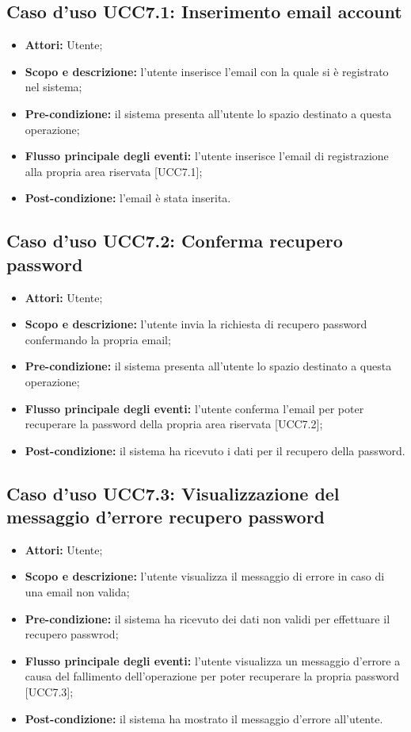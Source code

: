 \subsection{Caso d'uso UCC7.1: Inserimento email account}

\begin{itemize}
\item \textbf{Attori:} Utente;
\item \textbf{Scopo e descrizione:} l'utente inserisce l'email con la quale si è registrato nel sistema;
\item \textbf{Pre-condizione:} il sistema presenta all'utente lo spazio destinato a questa operazione;
\item \textbf{Flusso principale degli eventi:} l'utente inserisce l'email di registrazione alla propria area riservata [UCC7.1];
\item \textbf{Post-condizione:} l'email è stata inserita.
\end{itemize}

\subsection{Caso d'uso UCC7.2: Conferma recupero password}

\begin{itemize}
\item \textbf{Attori:} Utente;
\item \textbf{Scopo e descrizione:} l'utente invia la richiesta di recupero password confermando la propria email;
\item \textbf{Pre-condizione:} il sistema presenta all'utente lo spazio destinato a questa operazione;
\item \textbf{Flusso principale degli eventi:} l'utente conferma l'email per poter recuperare la password della propria area riservata [UCC7.2];
\item \textbf{Post-condizione:} il sistema ha ricevuto i dati per il recupero della password.
\end{itemize}

\subsection{Caso d'uso UCC7.3: Visualizzazione del messaggio d'errore recupero password}

\begin{itemize}
\item \textbf{Attori:} Utente;
\item \textbf{Scopo e descrizione:} l'utente visualizza il messaggio di errore in caso di una email non valida;
\item \textbf{Pre-condizione:} il sistema ha ricevuto dei dati non validi per effettuare il recupero passwrod;
\item \textbf{Flusso principale degli eventi:} l'utente visualizza un messaggio d'errore a causa del fallimento dell'operazione per poter recuperare la propria password [UCC7.3];
\item \textbf{Post-condizione:} il sistema ha mostrato il messaggio d'errore all'utente.
\end{itemize}


